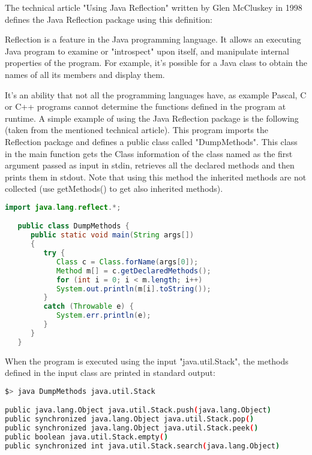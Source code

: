 The technical article "Using Java Reflection" written by Glen McCluskey in 1998 defines the Java Reflection package using this definition\cite{javareflection}:
\begin{quoting}[font=itshape, begintext={"}, endtext={"}]
Reflection is a feature in the Java programming language. It allows an executing Java program to examine or "introspect" upon itself, and manipulate internal properties of the program. For example, it's possible for a Java class to obtain the names of all its members and display them.
\end{quoting}
It's an ability that not all the programming languages have, as example Pascal, C or C++ programs cannot determine the functions defined in the program at runtime.
A simple example of using the Java Reflection package is the following (taken from the mentioned technical article). This program imports the Reflection package and defines a public class called "DumpMethods". This class in the main function gets the Class information of the class named as the first argument passed as input in stdin, retrieves all the declared methods and then prints them in stdout. Note that using this method the inherited methods are not collected (use getMethods() to get also inherited methods).
\begin{lstlisting}[language=Java]
import java.lang.reflect.*;

   public class DumpMethods {
      public static void main(String args[])
      {
         try {
            Class c = Class.forName(args[0]);
            Method m[] = c.getDeclaredMethods();
            for (int i = 0; i < m.length; i++)
            System.out.println(m[i].toString());
         }
         catch (Throwable e) {
            System.err.println(e);
         }
      }
   }
\end{lstlisting}
When the program is executed using the input "java.util.Stack", the methods defined in the input class are printed in standard output:
\begin{lstlisting}[language=Bash]
$> java DumpMethods java.util.Stack

public java.lang.Object java.util.Stack.push(java.lang.Object)
public synchronized java.lang.Object java.util.Stack.pop()
public synchronized java.lang.Object java.util.Stack.peek()
public boolean java.util.Stack.empty()
public synchronized int java.util.Stack.search(java.lang.Object)
\end{lstlisting}

